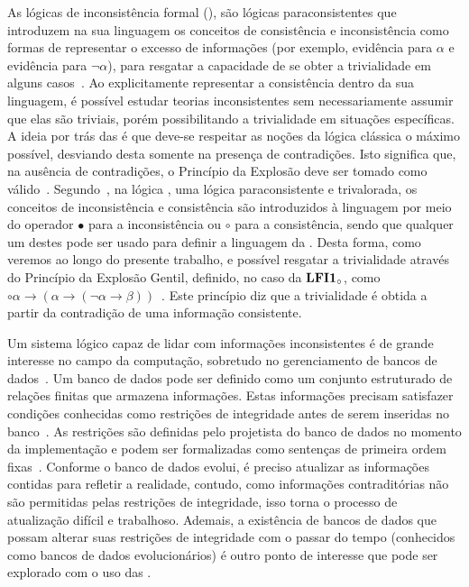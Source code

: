As lógicas de inconsistência formal (\lfis{}), são lógicas paraconsistentes que introduzem na sua linguagem os conceitos de consistência e inconsistência como formas de representar o excesso de informações (por exemplo, evidência para $\alpha$ e evidência para $\neg \alpha$), para resgatar a capacidade de se obter a trivialidade em alguns casos~\cite{carnielli2007}. Ao explicitamente representar a consistência dentro da sua linguagem, é possível estudar teorias inconsistentes sem necessariamente assumir que elas são triviais, porém possibilitando a trivialidade em situações específicas. A ideia por trás das \lfis{} é que deve-se respeitar as noções da lógica clássica o máximo possível, desviando desta somente na presença de contradições. Isto significa que, na ausência de contradições, o Princípio da Explosão deve ser tomado como válido~\cite{sep-logic-paraconsistent}. Segundo~, na lógica \lfium{}, uma lógica paraconsistente e trivalorada, os conceitos de inconsistência e consistência são introduzidos à linguagem por meio do operador $\bullet$ para a inconsistência ou $\circ$ para a consistência, sendo que qualquer um destes pode ser usado para definir a linguagem da \lfium{}. Desta forma, como veremos ao longo do presente trabalho, e possível resgatar a trivialidade através do Princípio da Explosão Gentil, definido, no caso da $\text{\textbf{LFI1}{}}_{\circ}$, como $\circ \alpha \rightarrow (\alpha \rightarrow (\neg \alpha \rightarrow \beta))$~\cite{carnielli2007}. Este princípio diz que a trivialidade é obtida a partir da contradição de uma informação consistente.


Um sistema lógico capaz de lidar com informações inconsistentes é de grande interesse no campo da computação, sobretudo no gerenciamento de bancos de dados~\cite{carnielli2000formal}. Um banco de dados pode ser definido como um conjunto estruturado de relações finitas que armazena informações. Estas informações precisam satisfazer condições conhecidas como restrições de integridade antes de serem inseridas no banco~\cite{Codd}. As restrições são definidas pelo projetista do banco de dados no momento da implementação e podem ser formalizadas como sentenças de primeira ordem fixas~\cite{carnielli2000formal}. Conforme o banco de dados evolui, é preciso atualizar as informações contidas para refletir a realidade, contudo, como informações contraditórias não são permitidas pelas restrições de integridade, isso torna o processo de atualização difícil e trabalhoso. Ademais, a existência de bancos de dados que possam alterar suas restrições de integridade com o passar do tempo (conhecidos como bancos de dados evolucionários) é outro ponto de interesse que pode ser explorado com o uso das \lfis{}.

